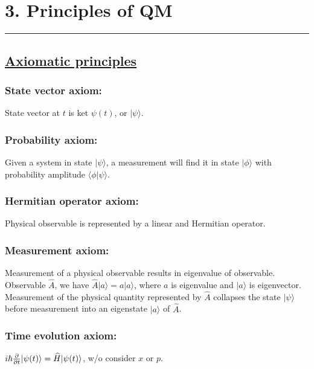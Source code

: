 

\section{3. Principles of QM} \hrule height 0.3pt \thinspace

\subsection{\underline{Axiomatic principles}}

\subsubsection{State vector axiom:} State vector at $t$ is ket $\psi(t)$, or $|\psi \rangle$.

\subsubsection{Probability axiom:} Given a system in state $|\psi \rangle$, a measurement will find it in state $|\phi \rangle$ with probability amplitude $\langle \phi | \psi \rangle$. 

\subsubsection{Hermitian operator axiom:} Physical observable is represented by a linear and Hermitian operator.

\subsubsection{Measurement axiom:} Measurement of a physical observable results in eigenvalue of observable. Observable $\widehat{A}$, we have $\widehat{A} | a \rangle = a | a \rangle$, where $a$ is eigenvalue and $|a \rangle$ is eigenvector. Measurement of the physical quantity represented by $\widehat{A}$ collapses the state $|\psi \rangle$ before measurement into an eigenstate $|a \rangle$ of $\widehat{A}$.

\subsubsection{Time evolution axiom:} $i \hbar \pdv{}{t} | \psi(t) \rangle = \widehat{H} |\psi(t) \rangle$, w/o consider $x$ or $p$.

